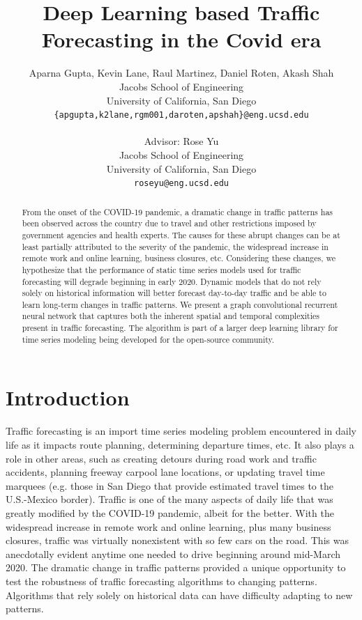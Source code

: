 \documentclass{article}
\title{
Deep Learning based Traffic Forecasting in the Covid era %
}
\author{
 Aparna Gupta, Kevin Lane, Raul Martinez, Daniel Roten, Akash Shah \\
  Jacobs School of Engineering \\
  University of California, San Diego \\
  \texttt{\{apgupta,\hspace{1mm}k2lane,\hspace{1mm}rgm001,\hspace{1mm}daroten,\hspace{1mm}apshah\}@eng.ucsd.edu} \\
  
  \And
  
  Advisor: Rose Yu \\
  Jacobs School of Engineering \\
  University of California, San Diego \\
  \texttt{roseyu@eng.ucsd.edu} \\
  
	
}
\begin{document}
\maketitle

\begin{abstract}
From the onset of the COVID-19 pandemic, a dramatic change in traffic patterns has been observed across the country due to travel and other restrictions imposed by government agencies and health experts. The causes for these abrupt changes can be at least partially attributed to the severity of the pandemic, the widespread increase in remote work and online learning, business closures, etc. Considering these changes, we hypothesize that the performance of static time series models used for traffic forecasting will degrade beginning in early 2020. Dynamic models that do not rely solely on historical information will better forecast day-to-day traffic and be able to learn long-term changes in traffic patterns. We present a graph convolutional recurrent neural network that captures both the inherent spatial and temporal complexities present in traffic forecasting. The algorithm is part of a larger deep learning library for time series modeling being developed for the open-source community.
\end{abstract}




\section{Introduction}

Traffic forecasting is an import time series modeling problem encountered in daily life as it impacts route planning, determining departure times, etc. It also plays a role in other areas, such as creating detours during road work and traffic accidents, planning freeway carpool lane locations, or updating travel time marquees (e.g. those in San Diego that provide estimated travel times to the U.S.-Mexico border). Traffic is one of the many aspects of daily life that was greatly modified by the COVID-19 pandemic, albeit for the better. With the widespread increase in remote work and online learning, plus many business closures, traffic was virtually nonexistent with so few cars on the road. This was anecdotally evident anytime one needed to drive beginning around mid-March 2020. The dramatic change in traffic patterns provided a unique opportunity to test the robustness of traffic forecasting algorithms to changing patterns. Algorithms that rely solely on historical data can have difficulty adapting to new patterns.
\end{document}
